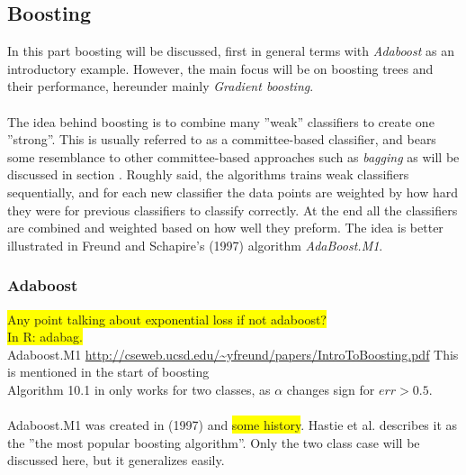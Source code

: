 \subsection{Boosting}
\label{subsub:Boosting}
In this part boosting will be discussed, first in general terms with \textit{Adaboost} as an introductory example. However, the main focus will be on boosting trees and their performance, hereunder mainly \textit{Gradient boosting}. \\
\\
The idea behind boosting is to combine many ''weak'' classifiers to create one ''strong''. This is usually referred to as a committee-based classifier, and bears some resemblance to other committee-based approaches such as \textit{bagging} as will be discussed in section . Roughly said, the algorithms trains weak classifiers sequentially, and for each new classifier the data points are weighted by how hard they were for previous classifiers to classify correctly. At the end all the classifiers are combined and weighted based on how well they preform. The idea is better illustrated in Freund and Schapire's (1997)  algorithm \textit{AdaBoost.M1}.
\subsubsection{Adaboost}
\label{subsub:Adaboost}
\colorbox{yellow}{Any point talking about exponential loss if not adaboost?}\\
\colorbox{yellow}{In R: adabag.}\\
Adaboost.M1 \url{http://cseweb.ucsd.edu/~yfreund/papers/IntroToBoosting.pdf} This is mentioned in the start of boosting \cite{modstat} \\
Algorithm 10.1 in \cite{modstat} only works for two classes, as $\alpha$ changes sign for $err > 0.5$. \\
\\
Adaboost.M1 was created in (1997)  and \colorbox{yellow}{some history}. Hastie et al. \cite{modstat} describes it as the ''the most popular boosting algorithm''. Only the two class case will be discussed here, but it generalizes easily. 

